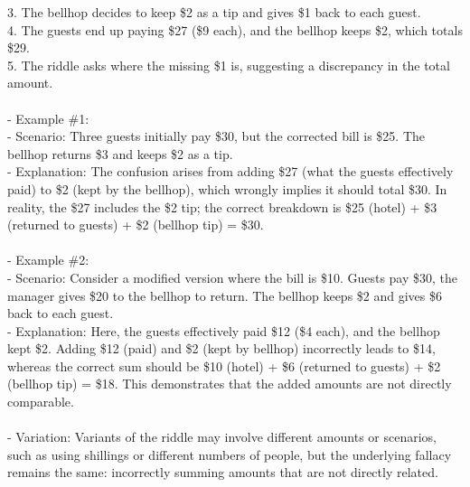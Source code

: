 \documentclass[a4paper,12pt,single,pdftex]{scrbook}
\begin{document}
    
        3. The bellhop decides to keep \$2 as a tip and gives \$1 back to each guest.
    \\

    
        4. The guests end up paying \$27 (\$9 each), and the bellhop keeps \$2, which totals \$29.
    \\

    
        5. The riddle asks where the missing \$1 is, suggesting a discrepancy in the total amount.
    \\

    
      
    \\

    
      - Example \#1:
    \\

    
        - Scenario: Three guests initially pay \$30, but the corrected bill is \$25. The bellhop returns \$3 and keeps \$2 as a tip.
    \\

    
        - Explanation: The confusion arises from adding \$27 (what the guests effectively paid) to \$2 (kept by the bellhop), which wrongly implies it should total \$30. In reality, the \$27 includes the \$2 tip; the correct breakdown is \$25 (hotel) + \$3 (returned to guests) + \$2 (bellhop tip) = \$30.
    \\

    
      
    \\

    
      - Example \#2:
    \\

    
        - Scenario: Consider a modified version where the bill is \$10. Guests pay \$30, the manager gives \$20 to the bellhop to return. The bellhop keeps \$2 and gives \$6 back to each guest.
    \\

    
        - Explanation: Here, the guests effectively paid \$12 (\$4 each), and the bellhop kept \$2. Adding \$12 (paid) and \$2 (kept by bellhop) incorrectly leads to \$14, whereas the correct sum should be \$10 (hotel) + \$6 (returned to guests) + \$2 (bellhop tip) = \$18. This demonstrates that the added amounts are not directly comparable.
    \\

    
      
    \\

    
      - Variation: Variants of the riddle may involve different amounts or scenarios, such as using shillings or different numbers of people, but the underlying fallacy remains the same: incorrectly summing amounts that are not directly related.
    \\
\end{document}
